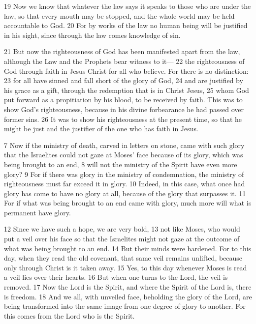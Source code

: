 \begin{bible}

19 Now we know that whatever the law says it speaks to those who are under the law, so that every mouth may be stopped, and the whole world may be held accountable to God. 20 For by works of the law no human being will be justified in his sight, since through the law comes knowledge of sin.

21 But now the righteousness of God has been manifested apart from the law, although the Law and the Prophets bear witness to it— 22 the righteousness of God through faith in Jesus Christ for all who believe. For there is no distinction: 23 for all have sinned and fall short of the glory of God, 24 and are justified by his grace as a gift, through the redemption that is in Christ Jesus, 25 whom God put forward as a propitiation by his blood, to be received by faith. This was to show God's righteousness, because in his divine forbearance he had passed over former sins. 26 It was to show his righteousness at the present time, so that he might be just and the justifier of the one who has faith in Jesus.


7 Now if the ministry of death, carved in letters on stone, came with such glory that the Israelites could not gaze at Moses' face because of its glory, which was being brought to an end, 8 will not the ministry of the Spirit have even more glory? 9 For if there was glory in the ministry of condemnation, the ministry of righteousness must far exceed it in glory. 10 Indeed, in this case, what once had glory has come to have no glory at all, because of the glory that surpasses it. 11 For if what was being brought to an end came with glory, much more will what is permanent have glory.

12 Since we have such a hope, we are very bold, 13 not like Moses, who would put a veil over his face so that the Israelites might not gaze at the outcome of what was being brought to an end. 14 But their minds were hardened. For to this day, when they read the old covenant, that same veil remains unlifted, because only through Christ is it taken away. 15 Yes, to this day whenever Moses is read a veil lies over their hearts. 16 But when one turns to the Lord, the veil is removed. 17 Now the Lord is the Spirit, and where the Spirit of the Lord is, there is freedom. 18 And we all, with unveiled face, beholding the glory of the Lord, are being transformed into the same image from one degree of glory to another. For this comes from the Lord who is the Spirit.


\end{bible}
